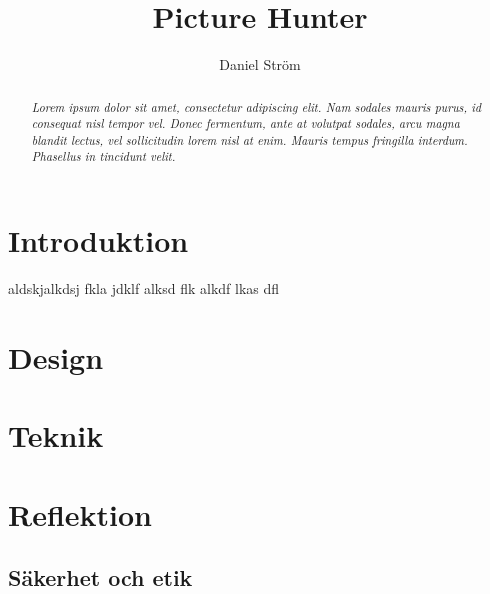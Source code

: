 \documentclass[11px, a4paper]{article}
\title{Picture Hunter}
\author{Daniel Ström \\ \mail{D@nielstrom.se}}
\begin{document}
\maketitle
\begin{abstract}
	\textit{
		Lorem ipsum dolor sit amet, consectetur adipiscing elit. Nam sodales mauris purus, id consequat nisl tempor vel. Donec fermentum, ante at volutpat sodales, arcu magna blandit lectus, vel sollicitudin lorem nisl at enim. Mauris tempus fringilla interdum. Phasellus in tincidunt velit.
	}
\end{abstract}

\tableofcontents

\listoffigures


\section{Introduktion}
	aldskjalkdsj fkla jdklf alksd flk alkdf lkas dfl

\section{Design}

\section{Teknik}

\section{Reflektion}
\subsection{Säkerhet och etik}



\begingroup
\raggedright
\printbibliography
{}
\endgroup
\end{document}
